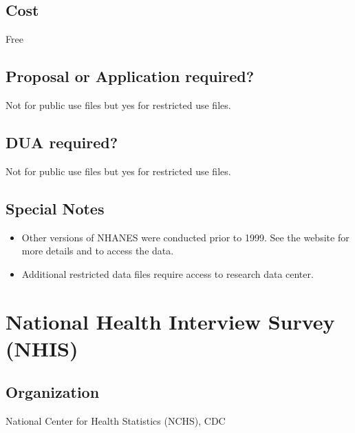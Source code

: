 \documentclass[
]{book}
\providecommand{\tightlist}{%
  \setlength{\itemsep}{0pt}\setlength{\parskip}{0pt}}
\begin{document}
\hypertarget{cost-50}{%
\section{Cost}\label{cost-50}}

Free

\hypertarget{proposal-or-application-required-50}{%
\section{Proposal or Application required?}\label{proposal-or-application-required-50}}

Not for public use files but yes for restricted use files.

\hypertarget{dua-required-50}{%
\section{DUA required?}\label{dua-required-50}}

Not for public use files but yes for restricted use files.

\hypertarget{special-notes-50}{%
\section{Special Notes}\label{special-notes-50}}

\begin{itemize}
\tightlist
\item
  Other versions of NHANES were conducted prior to 1999. See the website for more details and to access the data.
\item
  Additional restricted data files require access to research data center.
\end{itemize}

\mainmatter

\hypertarget{national-health-interview-survey-nhis}{%
\chapter{National Health Interview Survey (NHIS)}\label{national-health-interview-survey-nhis}}

\hypertarget{organization-51}{%
\section{Organization}\label{organization-51}}

National Center for Health Statistics (NCHS), CDC
\end{document}

